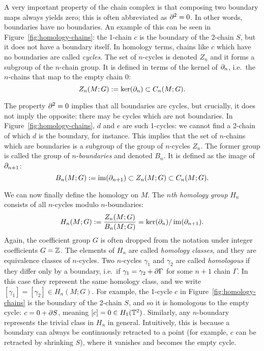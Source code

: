 A very important property of the chain complex is that composing two boundary maps always yields zero; this is often abbreviated as $\partial^2 = 0$. In other words, boundaries have no boundaries. An example of this can be seen in Figure~\ref{fig:homology-chains}: the 1-chain $c$ is the boundary of the 2-chain $S$, but it does not have a boundary itself. In homology terms, chains like $c$ which have no boundaries are called \emph{cycles}. The set of $n$-cycles is denoted $Z_n$ and it forms a subgroup of the $n$-chain group. It is defined in terms of the kernel of $\partial_n$, i.e.\ the $n$-chains that map to the empty chain 0:
\begin{equation*}
	Z_n(M;G) := \ker(\partial_n) \subset C_n(M;G).
\end{equation*}

The property $\partial^2 = 0$ implies that all boundaries are cycles, but crucially, it does not imply the opposite: there may be cycles which are not boundaries. In Figure~\ref{fig:homology-chains}, $d$ and $e$ are such 1-cycles: we cannot find a 2-chain of which $d$ is the boundary, for instance. This implies that the set of $n$-chains which are boundaries is a subgroup of the group of $n$-cycles $Z_n$. The former group is called the group of $n$-\emph{boundaries} and denoted $B_n$. It is defined as the image of $\partial_{n+1}$:
\begin{equation*}
	B_n(M;G) := \operatorname{im}(\partial_{n+1}) \subset Z_n(M;G) \subset C_n(M;G).
\end{equation*}

We can now finally define the homology on $M$. The \emph{$n$th homology group} $H_n$ consists of all $n$-cycles modulo $n$-boundaries:
\begin{equation*}
	H_n(M;G) := \frac{Z_n(M;G)}{B_n(M;G)} = \ker(\partial_n) / \operatorname{im}(\partial_{n+1}).
\end{equation*}
Again, the coefficient group $G$ is often dropped from the notation under integer coefficients $G=\mathbb{Z}$. The elements of $H_n$ are called \emph{homology classes}, and they are equivalence classes of $n$-cycles. Two $n$-cycles $\gamma_1$ and $\gamma_2$ are called \emph{homologous} if they differ only by a boundary, i.e.\ if $\gamma_1 = \gamma_2 + \partial\Gamma$ for some $n+1$ chain $\Gamma$. In this case they represent the same homology class, and we write $[\gamma_1] = [\gamma_2]\in H_n(M;G)$. For example, the 1-cycle $c$ in Figure~\ref{fig:homology-chains} is the boundary of the 2-chain $S$, and so it is homologous to the empty cycle: $c= 0 + \partial S$, meaning $[c] = 0\in H_1(\mathbb{T}^2)$. Similarly, any $n$-boundary represents the trivial class in $H_n$ in general. Intuitively, this is because a boundary can always be continuously retracted to a point (for example, $c$ can be retracted by shrinking $S$), where it vanishes and becomes the empty cycle.

